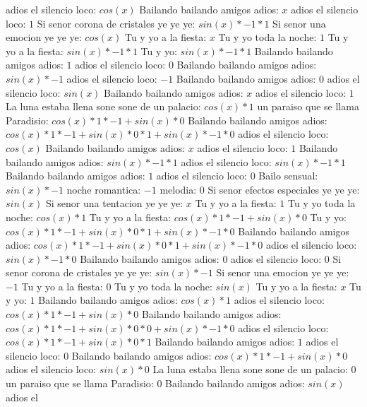 \documentclass{article}
\begin{document}
adios el silencio loco: $cos(x)$  \newline Bailando bailando amigos adios: $x$ adios el silencio loco: $1$  \newline Si senor corona de cristales ye ye ye: $sin(x)*-1*1$ Si senor una emocion ye ye ye: $cos(x)$  \newline Tu y yo a la fiesta: $x$ Tu y yo toda la noche: $1$  \newline Tu y yo a la fiesta: $sin(x)*-1*1$ Tu y yo: $sin(x)*-1*1$ Bailando bailando amigos adios: $1$ adios el silencio loco: $0$  \newline Bailando bailando amigos adios: $sin(x)*-1$ adios el silencio loco: $-1$ Bailando bailando amigos adios: $0$  \newline adios el silencio loco: $sin(x)$  \newline Bailando bailando amigos adios: $x$ adios el silencio loco: $1$  \newline La luna estaba llena sone sone de un palacio: $cos(x)*1$ un paraiso que se llama Paradisio: $cos(x)*1*-1+sin(x)*0$ Bailando bailando amigos adios: ${cos(x)*1*-1+sin(x)*0}*1+sin(x)*-1*0$ adios el silencio loco: $cos(x)$  \newline Bailando bailando amigos adios: $x$ adios el silencio loco: $1$  \newline Bailando bailando amigos adios: $sin(x)*-1*1$ adios el silencio loco: $sin(x)*-1*1$ Bailando bailando amigos adios: $1$ adios el silencio loco: $0$  \newline Bailo sensual: $sin(x)*-1$ noche romantica: $-1$ melodia: $0$  \newline Si senor efectos especiales ye ye ye: $sin(x)$  \newline Si senor una tentacion ye ye ye: $x$ Tu y yo a la fiesta: $1$  \newline Tu y yo toda la noche: $cos(x)*1$ Tu y yo a la fiesta: $cos(x)*1*-1+sin(x)*0$ Tu y yo: ${cos(x)*1*-1+sin(x)*0}*1+sin(x)*-1*0$ Bailando bailando amigos adios: ${cos(x)*1*-1+sin(x)*0}*1+sin(x)*-1*0$  \newline adios el silencio loco: $sin(x)*-1*0$ Bailando bailando amigos adios: $0$ adios el silencio loco: $0$  \newline Si senor corona de cristales ye ye ye: $sin(x)*-1$ Si senor una emocion ye ye ye: $-1$ Tu y yo a la fiesta: $0$  \newline Tu y yo toda la noche: $sin(x)$  \newline Tu y yo a la fiesta: $x$ Tu y yo: $1$  \newline Bailando bailando amigos adios: $cos(x)*1$ adios el silencio loco: $cos(x)*1*-1+sin(x)*0$ Bailando bailando amigos adios: ${cos(x)*1*-1+sin(x)*0}*0+sin(x)*-1*0$ adios el silencio loco: ${cos(x)*1*-1+sin(x)*0}*1$ Bailando bailando amigos adios: $1$ adios el silencio loco: $0$  \newline Bailando bailando amigos adios: $cos(x)*1*-1+sin(x)*0$  \newline adios el silencio loco: $sin(x)*0$ La luna estaba llena sone sone de un palacio: $0$ un paraiso que se llama Paradisio: $0$  \newline Bailando bailando amigos adios: $sin(x)$  \newline adios el 
\end{document}

